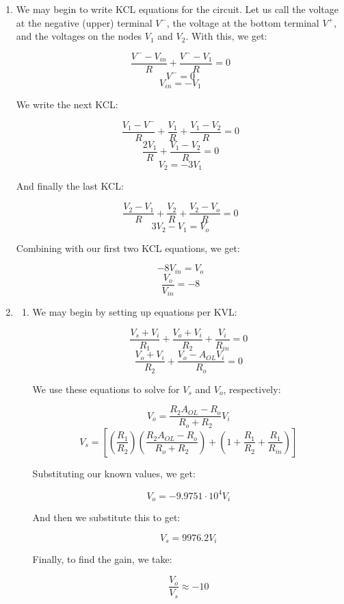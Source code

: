 \begin{enumerate}

  \item

    We may begin to write KCL equations for the circuit. Let us call the voltage at the negative (upper) terminal $V^{-}$, the voltage at the bottom terminal $V^{+}$, and the voltages on the nodes $V_1$ and $V_2$. With this, we get:

    $$\frac{V^{-}-V_{in}}{R}+\frac{V^{-}-V_1}{R}=0$$
    $$V^{-}=0$$
    $$V_{in}=-V_{1}$$

    We write the next KCL:

    $$\frac{V_1-V^{-}}{R}+\frac{V_1}{R}+\frac{V_1-V_2}{R}=0$$
    $$\frac{2V_1}{R}+\frac{V_1-V_2}{R}=0$$
    $$V_2=-3V_1$$

    And finally the last KCL:

    $$\frac{V_2-V_1}{R}+\frac{V_2}{R}+\frac{V_2-V_o}{R}=0$$
    $$3V_2-V_1=V_o$$

    Combining with our first two KCL equations, we get:

    $$-8V_{in}=V_o$$
    $$\boxed{\frac{V_o}{V_{in}}=-8}$$

  \item

    \begin{enumerate}

      \item 

        We may begin by setting up equations per KVL:

        $$\frac{V_s+V_i}{R_1}+\frac{V_o+V_i}{R_2}+\frac{V_i}{R_{in}}=0$$
        $$\frac{V_o+V_i}{R_2}+\frac{V_o-A_{OL}V_i}{R_o}=0$$

        We use these equations to solve for $V_s$ and $V_o$, respectively:

        $$V_o=\frac{R_2A_{OL}-R_o}{R_o+R_2}V_i$$
        $$V_s=\left[ \left( \frac{R_1}{R_2} \right)\left( \frac{R_2A_{OL}-R_o}{R_o+R_2} \right)+\left( 1+\frac{R_1}{R_2}+\frac{R_1}{R_{in}} \right) \right]$$

        Substituting our known values, we get:

        $$V_o=-9.9751\cdot10^{4}V_i$$

        And then we substitute this to get:

        $$V_s=9976.2V_i$$

        Finally, to find the gain, we take:

        $$\boxed{\frac{V_o}{V_s}\approx -10}$$


\end{enumerate}
\end{enumerate}
